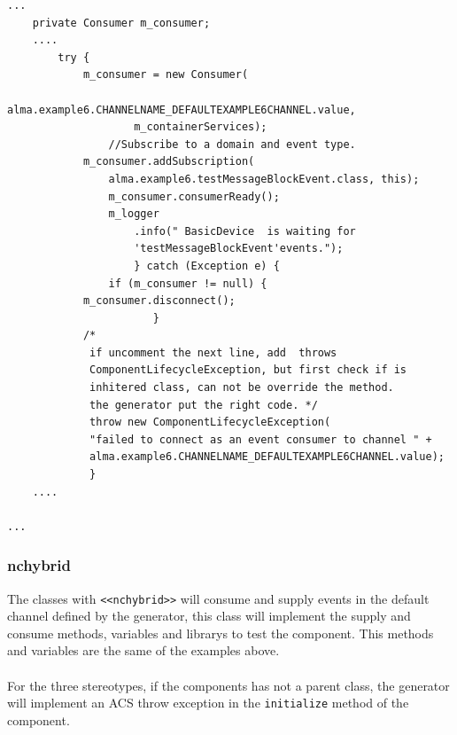 \begin{center}
\begin{verbatim}
...
    private Consumer m_consumer;
    ....
        try {
            m_consumer = new Consumer(
                alma.example6.CHANNELNAME_DEFAULTEXAMPLE6CHANNEL.value,
                    m_containerServices);
                //Subscribe to a domain and event type.
            m_consumer.addSubscription(
                alma.example6.testMessageBlockEvent.class, this);
                m_consumer.consumerReady();
                m_logger
                    .info(" BasicDevice  is waiting for 
                    'testMessageBlockEvent'events."); 
                    } catch (Exception e) {
                if (m_consumer != null) {
            m_consumer.disconnect();
			           }
            /*
             if uncomment the next line, add  throws
             ComponentLifecycleException, but first check if is 
             inhitered class, can not be override the method. 
             the generator put the right code. */ 
             throw new ComponentLifecycleException( 
             "failed to connect as an event consumer to channel " +
             alma.example6.CHANNELNAME_DEFAULTEXAMPLE6CHANNEL.value); 
             }
    ....
    
...
\end{verbatim}
\end{center}


\subsubsection {nchybrid}
The classes with  \verb+<<nchybrid>>+ will consume and supply events in the
default channel defined by the generator, this class will implement the supply
and consume methods, variables and librarys to test the component. This methods
and variables are the same of the examples above.\\
\\
For the three stereotypes, if the components has not a parent class, the
generator will implement an ACS throw exception in the   \verb+initialize+
method of the component.


